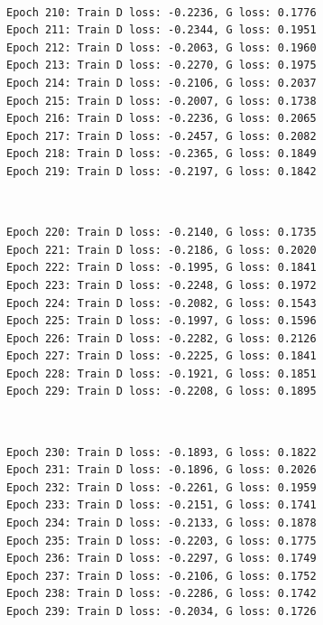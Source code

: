 \documentclass[11pt]{article}
\begin{document}
    \begin{center}
    \end{center}
    { \hspace*{\fill} \\}
    
    \begin{Verbatim}[commandchars=\\\{\}]
Epoch 210: Train D loss: -0.2236, G loss: 0.1776
Epoch 211: Train D loss: -0.2344, G loss: 0.1951
Epoch 212: Train D loss: -0.2063, G loss: 0.1960
Epoch 213: Train D loss: -0.2270, G loss: 0.1975
Epoch 214: Train D loss: -0.2106, G loss: 0.2037
Epoch 215: Train D loss: -0.2007, G loss: 0.1738
Epoch 216: Train D loss: -0.2236, G loss: 0.2065
Epoch 217: Train D loss: -0.2457, G loss: 0.2082
Epoch 218: Train D loss: -0.2365, G loss: 0.1849
Epoch 219: Train D loss: -0.2197, G loss: 0.1842

    \end{Verbatim}

    \begin{center}
    \end{center}
    { \hspace*{\fill} \\}
    
    \begin{Verbatim}[commandchars=\\\{\}]
Epoch 220: Train D loss: -0.2140, G loss: 0.1735
Epoch 221: Train D loss: -0.2186, G loss: 0.2020
Epoch 222: Train D loss: -0.1995, G loss: 0.1841
Epoch 223: Train D loss: -0.2248, G loss: 0.1972
Epoch 224: Train D loss: -0.2082, G loss: 0.1543
Epoch 225: Train D loss: -0.1997, G loss: 0.1596
Epoch 226: Train D loss: -0.2282, G loss: 0.2126
Epoch 227: Train D loss: -0.2225, G loss: 0.1841
Epoch 228: Train D loss: -0.1921, G loss: 0.1851
Epoch 229: Train D loss: -0.2208, G loss: 0.1895

    \end{Verbatim}

    \begin{center}
    \end{center}
    { \hspace*{\fill} \\}
    
    \begin{Verbatim}[commandchars=\\\{\}]
Epoch 230: Train D loss: -0.1893, G loss: 0.1822
Epoch 231: Train D loss: -0.1896, G loss: 0.2026
Epoch 232: Train D loss: -0.2261, G loss: 0.1959
Epoch 233: Train D loss: -0.2151, G loss: 0.1741
Epoch 234: Train D loss: -0.2133, G loss: 0.1878
Epoch 235: Train D loss: -0.2203, G loss: 0.1775
Epoch 236: Train D loss: -0.2297, G loss: 0.1749
Epoch 237: Train D loss: -0.2106, G loss: 0.1752
Epoch 238: Train D loss: -0.2286, G loss: 0.1742
Epoch 239: Train D loss: -0.2034, G loss: 0.1726

    \end{Verbatim}
\end{document}

